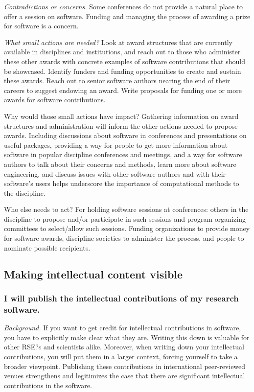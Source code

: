 \documentclass[a4paper,UKenglish]{dagman}
\newcommand{\onhere}{\yellowbox{$\Rightarrow$ OSCAR: CONTINUE HERE $\Leftarrow$}}
\renewcommand{\paragraph}[1]{\subsubsection*{#1}\xspace}
\begin{document}
\emph{Contradictions or concerns.} Some conferences do not provide a natural place to offer a session on software. 
Funding and managing the process of awarding a prize for software is a concern. 

\emph{What small actions are needed?}
Look at award structures that are currently available in disciplines and institutions, and reach out to those who administer these other awards with concrete examples of software contributions that should be showcased. Identify funders and funding opportunities to create and sustain these awards. Reach out to senior software authors nearing the end of their careers to suggest endowing an award. Write proposals for funding one or more awards for software contributions.

Why would those small actions have impact?
Gathering information on award structures and administration will inform the other actions needed to propose awards.
Including discussions about software in conferences and presentations on useful packages, providing a way for people to get more information about software in popular discipline conferences and meetings, and a way for software authors to talk about their concerns and methods, learn more about software engineering, and discuss issues with other software authors and with their software's users helps underscore the importance of computational methods to the discipline.

Who else needs to act? 
For holding software sessions at conferences: others in the discipline to propose and/or participate in such sessions and program organizing committees to select/allow such sessions. 
Funding organizations to provide money for software awards, discipline societies to administer the process, and people to nominate possible recipients. 

\subsection{Making intellectual content visible}


\paragraph{I will publish the intellectual contributions of my research software.}

\onhere


\emph{Background.} 
If you want to get credit for intellectual contributions in software, you have to explicitly make clear what they are. Writing this down is valuable for other RSE?s and scientists alike. Moreover, when writing down your intellectual contributions, you will put them in a larger context, forcing yourself to take a broader viewpoint. Publishing these contributions in international peer-reviewed venues strengthens and legitimizes the case that there are significant intellectual contributions in the software.
\end{document}

